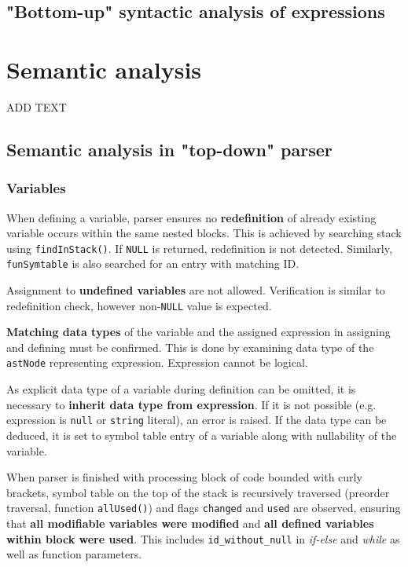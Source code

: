\documentclass[a4paper, 11pt]{article}
\begin{document}
\subsection{"Bottom-up" syntactic analysis of expressions}\label{sec:EXPRPARSER}

\section{Semantic analysis}\label{sec:SEMANTIC}
ADD TEXT
\subsection{Semantic analysis in "top-down" parser}
\subsubsection{Variables}
When defining a variable, parser ensures no \textbf{redefinition} of already
existing variable occurs within the same nested blocks. This is achieved by searching stack using
\verb|findInStack()|. If \verb|NULL| is returned, redefinition is not detected. Similarly,
\verb|funSymtable| is also searched for an entry with matching ID.
\par Assignment to \textbf{undefined variables} are not allowed. Verification is similar to redefinition check,
however non-\verb|NULL| value is expected.
\par \textbf{Matching data types} of the variable and the assigned expression in assigning and defining must be confirmed.
This is done by examining data type of the \verb|astNode| representing expression. Expression cannot be logical.
\par As explicit data type of a variable during definition can be omitted, it is necessary to \textbf{inherit data type
from expression}. If it is not possible (e.g. expression is \verb|null| or \verb|string| literal), an error is raised.
If the data type can be deduced, it is set to symbol table entry of a variable along with nullability of the variable.
\par When parser is finished with processing block of code bounded with curly brackets, symbol table on the top of the stack
is recursively traversed (preorder traversal, function \verb|allUsed()|) and flags \verb|changed| and \verb|used| are observed,
ensuring that \textbf{all modifiable variables were modified} and \textbf{all defined variables within block were used}. This includes
\verb|id_without_null| in \textit{if-else} and \textit{while} as well as function parameters.
\end{document}
